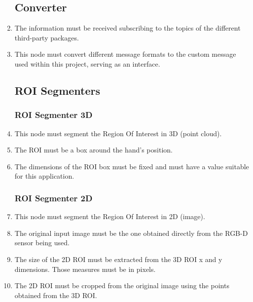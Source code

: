 \documentclass{article}
\makeatletter
\def\threedigits#1{\expandafter\@threedigits\csname c@#1\endcsname}
\def\@threedigits#1{%
  \ifnum#1<100 0\fi
  \ifnum#1<10 0\fi
  \number#1}
\makeatother
\begin{document}
\begin{center}
\begin{enumerate}[label=\textbf{FR\threedigits*}, leftmargin=2cm]
 
\subsection{Converter}

\item The information must be received subscribing to the topics of the different third-party packages. 
\item This node must convert different message formats to the custom message used within this project, serving as an interface. 


\subsection{ROI Segmenters}

   \subsubsection{ROI Segmenter 3D}
	\item This node must segment the Region Of Interest in 3D (point cloud). 
	\item The ROI must be a box around the hand's position. 
	\item The dimensions of the ROI box must be fixed and must have a value suitable for this application.  
   \subsubsection{ROI Segmenter 2D}
   	\item This node must segment the Region Of Interest in 2D (image).
   	\item The original input image must be the one obtained directly from the RGB-D sensor being used.
   	\item The size of the 2D ROI must be extracted from the 3D ROI x and y dimensions. Those measures must be in pixels. 
	\item The 2D ROI must be cropped from the original image using the points obtained from the 3D ROI. 


\end{enumerate}
\end{center}
\end{document}
